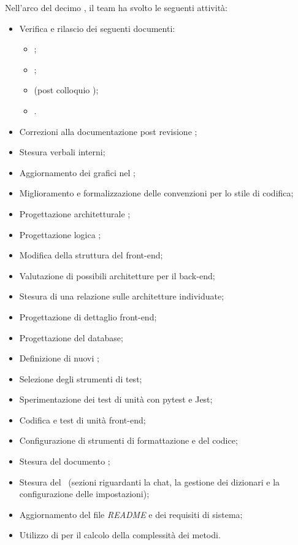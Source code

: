 Nell'arco del decimo , il team ha svolto le seguenti attività:
\begin{itemize}
 \item Verifica e rilascio dei seguenti documenti:
  \begin{itemize}
    \item \NdP;
    \item \PdP;
    \item \AdR{} (post colloquio \RTB);
    \item \PdQ.
  \end{itemize}
  \item Correzioni alla documentazione post revisione ;
  \item Stesura verbali interni;
  \item Aggiornamento dei grafici nel \PdQ;
  \item Miglioramento e formalizzazione delle convenzioni per lo stile di codifica;
  \item Progettazione architetturale ;
  \item Progettazione logica ;
  \item Modifica della struttura del front-end;
  \item Valutazione di possibili architetture per il back-end;
  \item Stesura di una relazione sulle architetture individuate;
  \item Progettazione di dettaglio front-end;
  \item Progettazione del database;
  \item Definizione di nuovi ;
  \item Selezione degli strumenti di test;
  \item Sperimentazione dei test di unità con pytest e Jest;
  \item Codifica e test di unità front-end;
  \item Configurazione di strumenti di formattazione e  del codice;
  \item Stesura del documento \ST;
  \item Stesura del \MU\ (sezioni riguardanti la chat, la gestione dei dizionari e la configurazione delle impostazioni);
  \item Aggiornamento del file \textit{README} e dei requisiti di sistema;
  \item Utilizzo di  per il calcolo della complessità dei metodi.
\end{itemize}

